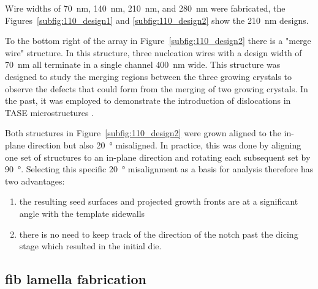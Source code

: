Wire widths of \qty{70}{\nano\metre}, \qty{140}{\nano\metre}, \qty{210}{\nano\metre}, and \qty{280}{\nano\metre} were fabricated, the Figures~\ref{subfig:110_design1} and \ref{subfig:110_design2} show the \qty{210}{\nano\metre} designs.

To the bottom right of the array in Figure~\ref{subfig:110_design2} there is a "merge wire" structure. In this structure, three nucleation wires with a design width of \qty{70}{\nano\metre} all terminate in a single channel \qty{400}{\nano\metre} wide. This structure was designed to study the merging regions between the three growing crystals to observe the defects that could form from the merging of two growing crystals. In the past, it was employed to demonstrate the introduction of dislocations in \acs{TASE} microstructures \cite{Mauthe2021}.

Both structures in Figure~\ref{subfig:110_design2} were grown aligned to the in-plane  direction but also \qty{20}{\degree} misaligned. In practice, this was done by aligning one set of structures to an in-plane  direction and rotating each subsequent set by \qty{90}{\degree}. Selecting this specific \qty{20}{\degree} misalignment as a basis for analysis therefore has two advantages:
\begin{enumerate}
    \item the resulting seed surfaces and projected growth fronts are at a significant angle with the template sidewalls
    \item there is no need to keep track of the direction of the notch past the dicing stage which resulted in the initial  die.
\end{enumerate}

\subsection{\texorpdfstring{\acs{fib} lamella fabrication}{FIB lamella fabrication}}

